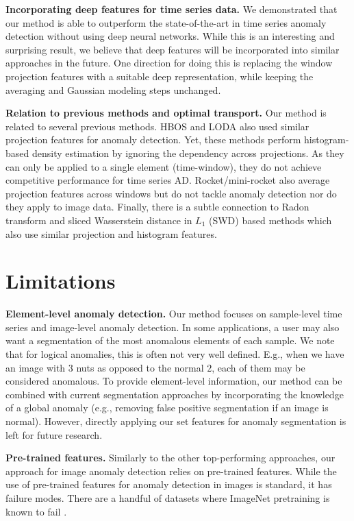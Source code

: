 \documentclass{article}
\begin{document}
\textbf{Incorporating deep features for time series data.} We demonstrated that our method is able to outperform the state-of-the-art in time series anomaly detection without using deep neural networks. While this is an interesting and surprising result, we believe that deep features will be incorporated into similar approaches in the future. One direction for doing this is replacing the window projection features with a suitable deep representation, while keeping the averaging and Gaussian modeling steps unchanged. 

\textbf{Relation to previous methods and optimal transport.} Our method is related to several previous methods. HBOS \citep{goldstein2012histogram} and LODA \citep{pevny2016loda} also used similar projection features for anomaly detection. Yet, these methods perform histogram-based density estimation by ignoring the dependency across projections. As they can only be applied to a single element (time-window), they do not achieve competitive performance for time series AD. Rocket/mini-rocket \citep{dempster2020rocket, dempster2021minirocket} also average projection features across windows but do not tackle anomaly detection nor do they apply to image data. Finally, there is a subtle connection to Radon transform \citep{kolouri2015radon} and sliced Wasserstein distance in $L_1$ (SWD) based methods \citep{bonneel2015sliced} which also use similar projection and histogram features. 

\section{Limitations} 

\textbf{Element-level anomaly detection.} Our method focuses on sample-level time series and image-level anomaly detection. In some applications, a user may also want a segmentation of the most anomalous elements of each sample. We note that for logical anomalies, this is often not very well defined. E.g., when we have an image with $3$ nuts as opposed to the normal $2$, each of them may be considered anomalous. To provide element-level information, our method can be combined with current segmentation approaches by incorporating the knowledge of a global anomaly (e.g., removing false positive segmentation if an image is normal). However, directly applying our set features for anomaly segmentation is left for future research. 

\textbf{Pre-trained features.} Similarly to the other top-performing approaches, our approach for image anomaly detection relies on pre-trained features. While the use of pre-trained features for anomaly detection in images is standard, it has failure modes. There are a handful of datasets where ImageNet pretraining is known to fail \cite{yousef2023no}. 
\end{document}
